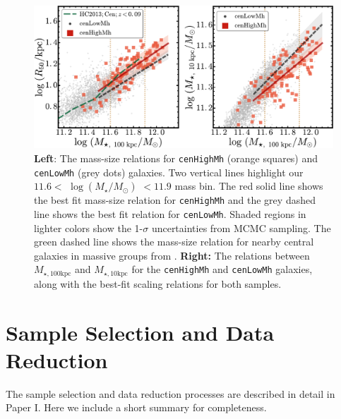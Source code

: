 \documentclass[a4paper,fleqn,usenatbib]{mnras}
\def\rbcg{\texttt{cenHighMh}}
\def\nbcg{\texttt{cenLowMh}}
\def\logms{{$\log (M_{\star}/M_{\odot})$}}
\def\minn{{$M_{\star,10\mathrm{kpc}}$}}
\def\mtot{{$M_{\star,100\mathrm{kpc}}$}}
\begin{document}
  \begin{figure}
      \centering 
      \includegraphics[width=\textwidth]{fig/redbcg_scaling_relation}
      \caption{
          \textbf{Left}: The mass-size relations for \rbcg{} (orange squares) and 
          \nbcg{} (grey dots) galaxies. 
          Two vertical lines highlight our $11.6<$ \logms{} $<11.9$ mass bin. 
          The red solid line shows the best fit mass-size relation for \rbcg{} and the 
          grey dashed line shows the best fit relation for \nbcg{}. 
          Shaded regions in lighter colors show the 1-$\sigma$ uncertainties
          from MCMC sampling.  
          The green dashed line shows the mass-size relation for nearby central 
          galaxies in massive groups from \citet{HCompany13}. 
          \textbf{Right:} The relations between \mtot{} and \minn{} for the 
          \rbcg{} and \nbcg{} galaxies, along with the best-fit scaling relations for 
          both samples.
          }
      \label{fig:scaling_relation} 
  \end{figure}

\section{Sample Selection and Data Reduction}
    \label{sec:data}
    
    The sample selection and data reduction processes are described in detail in 
    Paper I. 
    Here we include a short summary for completeness.
    
\end{document}
